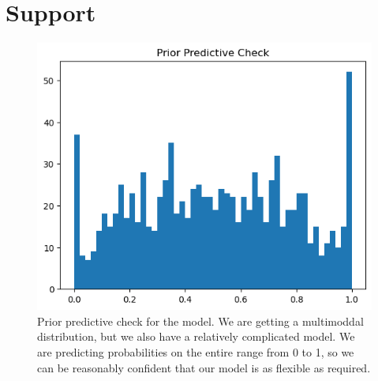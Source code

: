 \documentclass[12pt]{article}
\begin{document}
\section{Support}

\begin{figure}[h]
    \centering
    \includegraphics[width=\textwidth]{images/prior_predictive_check.png}
    \caption{Prior predictive check for the model. We are getting a multimoddal distribution, but we
        also have a relatively complicated model. We are predicting probabilities on the entire
        range from 0 to 1, so we can be reasonably confident that our model is as flexible as required.}
    \label{fig:ppc}
\end{figure}
\end{document}

